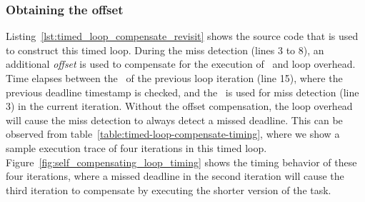 \subsubsection{Obtaining the offset}
Listing~\ref{lst:timed_loop_compensate_revisit} shows the source code that is used to construct this timed loop. 
During the miss detection (lines 3 to 8), an additional \textit{offset} is used to compensate for the execution of \delayuntil\ and loop overhead.
Time elapses between the \delayuntil\ of the previous loop iteration (line 15), where the previous deadline timestamp is checked, and the \gettime\ is used for miss detection (line 3) in the current iteration.
Without the offset compensation, the loop overhead will cause the miss detection to always detect a missed deadline.
This can be observed from table~\ref{table:timed-loop-compensate-timing}, where we show a sample execution trace of four iterations in this timed loop.  
Figure~\ref{fig:self_compensating_loop_timing} shows the timing behavior of these four iterations, where a missed deadline in the second iteration will cause the third iteration to compensate by executing the shorter version of the task.

